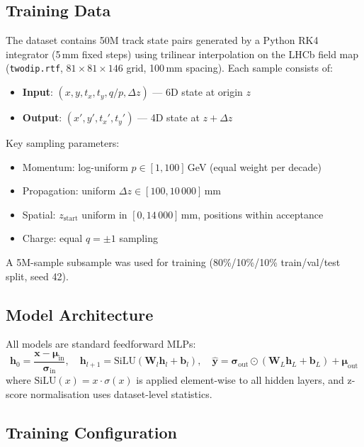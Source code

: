 \documentclass[11pt,a4paper]{article}
\newcommand{\dz}{\Delta z}
\newcommand{\qop}{q/p}
\newcommand{\tx}{t_x}
\newcommand{\ty}{t_y}
\begin{document}
\subsection{Training Data}

The dataset contains 50M track state pairs generated by a Python RK4 integrator (5\,mm fixed steps) using trilinear interpolation on the LHCb field map (\texttt{twodip.rtf}, $81\times81\times146$ grid, 100\,mm spacing).
Each sample consists of:
\begin{itemize}[nosep]
  \item \textbf{Input}: $(x, y, \tx, \ty, \qop, \dz)$ --- 6D state at origin $z$
  \item \textbf{Output}: $(x', y', \tx', \ty')$ --- 4D state at $z + \dz$
\end{itemize}

Key sampling parameters:
\begin{itemize}[nosep]
  \item Momentum: log-uniform $p \in [1, 100]$\,GeV (equal weight per decade)
  \item Propagation: uniform $\dz \in [100, 10\,000]$\,mm
  \item Spatial: $z_\text{start}$ uniform in $[0, 14\,000]$\,mm, positions within acceptance
  \item Charge: equal $q = \pm1$ sampling
\end{itemize}

A 5M-sample subsample was used for training (80\%/10\%/10\% train/val/test split, seed 42).

\subsection{Model Architecture}

All models are standard feedforward MLPs:
\begin{equation}
  \mathbf{h}_0 = \frac{\mathbf{x} - \boldsymbol{\mu}_\text{in}}{\boldsymbol{\sigma}_\text{in}}, \quad
  \mathbf{h}_{l+1} = \text{SiLU}(\mathbf{W}_l \mathbf{h}_l + \mathbf{b}_l), \quad
  \hat{\mathbf{y}} = \boldsymbol{\sigma}_\text{out} \odot (\mathbf{W}_L \mathbf{h}_L + \mathbf{b}_L) + \boldsymbol{\mu}_\text{out}
\end{equation}
where $\text{SiLU}(x) = x\cdot\sigma(x)$ is applied element-wise to all hidden layers, and z-score normalisation uses dataset-level statistics.

\subsection{Training Configuration}
\end{document}
